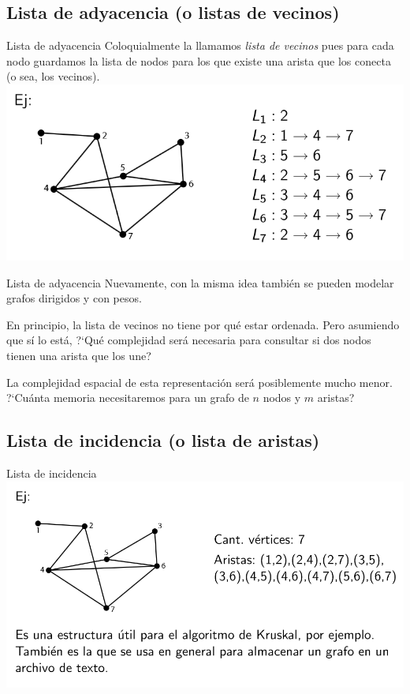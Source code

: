\documentclass[compress]{beamer}
\newcommand{\bigpause}{\bigskip \pause}
\begin{document}
\subsection{Lista de adyacencia (o listas de vecinos)}

\begin{frame}{Lista de adyacencia}
Coloquialmente la llamamos {\it lista de vecinos} pues para cada nodo guardamos la lista de nodos para los que existe una arista que los conecta (o sea, los vecinos).
\bigskip
\includegraphics[scale=0.5]{lista-vecinos.png}
\end{frame}

\begin{frame}{Lista de adyacencia}
Nuevamente, con la misma idea tambi\'en se pueden modelar grafos dirigidos y con pesos.\bigskip

En principio, la lista de vecinos no tiene por qu\'e estar ordenada. Pero asumiendo que s\'i lo est\'a, ?`Qu\'e complejidad ser\'a necesaria para consultar si dos nodos tienen una arista que los une?  \bigpause

La complejidad espacial de esta representaci\'on ser\'a posiblemente mucho menor. ?`Cu\'anta memoria necesitaremos para un grafo de $n$ nodos y $m$ aristas? 
\end{frame}

\subsection{Lista de incidencia (o lista de aristas)}
\begin{frame}{Lista de incidencia}
\includegraphics[scale=0.5]{lista-aristas.png}
\end{frame}
\end{document}
